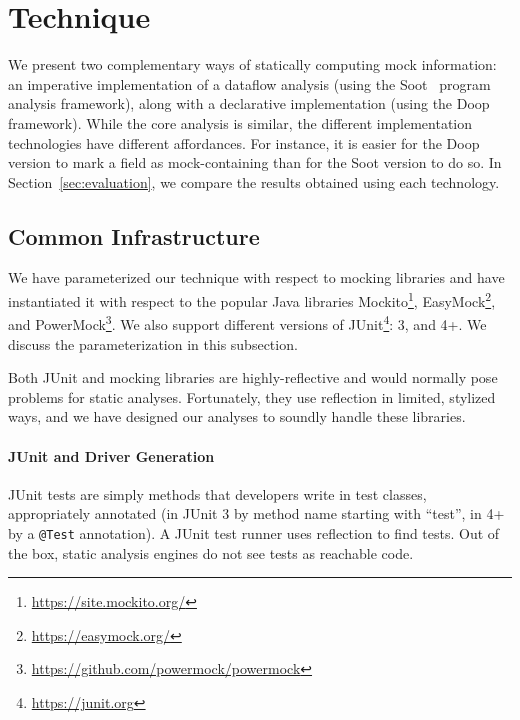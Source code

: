 \section{Technique}
\label{sec:technique}

We present two complementary ways of statically computing mock information: an imperative implementation of a dataflow analysis (using the Soot~\cite{Vallee-Rai:1999:SJB:781995.782008} program analysis framework), along with a declarative implementation (using the Doop~\cite{bravenboer09:_stric_declar_specif_sophis_point_analy} framework). While the core analysis is similar, the different implementation technologies have different affordances. For instance, it is easier for the Doop version to mark a field as mock-containing than for the Soot version to do so. In Section~\ref{sec:evaluation}, we compare the results obtained using each technology.

\subsection{Common Infrastructure}
We have parameterized our technique with respect to mocking libraries and have instantiated it with respect to the popular Java libraries Mockito\footnote{\url{https://site.mockito.org/}}, EasyMock\footnote{\url{https://easymock.org/}}, and PowerMock\footnote{\url{https://github.com/powermock/powermock}}. We also support different versions of JUnit\footnote{\url{https://junit.org}}: 3, and 4+. We discuss the parameterization in this subsection.

Both JUnit and mocking libraries are highly-reflective and would normally pose problems for static analyses. Fortunately, they use reflection in limited, stylized ways, and we have designed our analyses to soundly handle these libraries.

\paragraph{JUnit and Driver Generation}
JUnit tests are simply methods that developers write in test classes, appropriately annotated (in JUnit 3 by method name starting with ``test'', in 4+ by a \texttt{@Test} annotation). A JUnit test runner uses reflection to find tests. Out of the box, static analysis engines do not see tests as reachable code.


